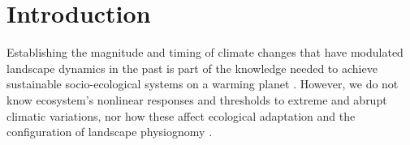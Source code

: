 \documentclass[
  authoryear,
  preprint,
  3p]{elsarticle}
\begin{document}
\hypertarget{introduction}{%
\section{Introduction}\label{introduction}}

Establishing the magnitude and timing of climate changes that have
modulated landscape dynamics in the past is part of the knowledge needed
to achieve sustainable socio-ecological systems on a warming planet
\citep{mucinaBiomeEvolutionCrucial2019, berdugoGlobalEcosystemThresholds2020}.
However, we do not know ecosystem's nonlinear responses and thresholds
to extreme and abrupt climatic variations, nor how these affect
ecological adaptation and the configuration of landscape physiognomy
\citep{berdugoGlobalEcosystemThresholds2020, eshelPlantEcologicalGenomics2021}.
\end{document}

